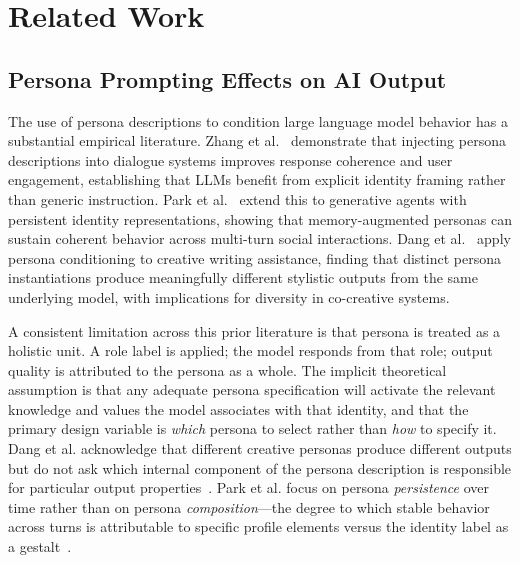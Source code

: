 \section{Related Work}
\label{sec:related}

\subsection{Persona Prompting Effects on AI Output}

The use of persona descriptions to condition large language model behavior has a substantial empirical literature. Zhang et al.~\cite{zhang2018personas} demonstrate that injecting persona descriptions into dialogue systems improves response coherence and user engagement, establishing that LLMs benefit from explicit identity framing rather than generic instruction. Park et al.~\cite{park2023generative} extend this to generative agents with persistent identity representations, showing that memory-augmented personas can sustain coherent behavior across multi-turn social interactions. Dang et al.~\cite{dang2023personas} apply persona conditioning to creative writing assistance, finding that distinct persona instantiations produce meaningfully different stylistic outputs from the same underlying model, with implications for diversity in co-creative systems.

A consistent limitation across this prior literature is that persona is treated as a holistic unit. A role label is applied; the model responds from that role; output quality is attributed to the persona as a whole. The implicit theoretical assumption is that any adequate persona specification will activate the relevant knowledge and values the model associates with that identity, and that the primary design variable is \emph{which} persona to select rather than \emph{how} to specify it. Dang et al. acknowledge that different creative personas produce different outputs but do not ask which internal component of the persona description is responsible for particular output properties~\cite{dang2023personas}. Park et al. focus on persona \emph{persistence} over time rather than on persona \emph{composition}---the degree to which stable behavior across turns is attributable to specific profile elements versus the identity label as a gestalt~\cite{park2023generative}.

